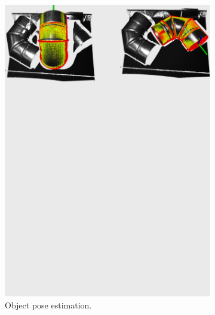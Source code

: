 \begin{figure}[h!]
{\begin{tcolorbox}
\begin{subfigure}[c]{1\textwidth}
          \includegraphics[trim={0cm 23cm 0cm 0cm},clip,width=1\linewidth,angle=0]{Cap5/Figuras/picking_mari4yard/object_detection.pdf}
          \caption{Object pose estimation.}
          \label{fig:cover_plate}
      \end{subfigure}
      \hfill
      \begin{subfigure}[c]{1\textwidth}
          \centering

\end{subfigure}
\end{tcolorbox}}
\end{figure}
